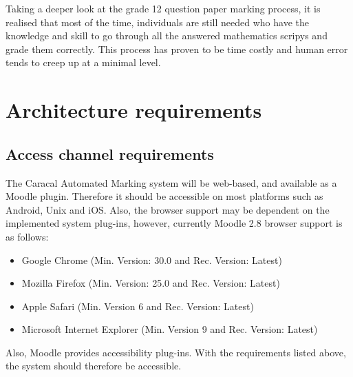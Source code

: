 \documentclass{article}
\begin{document}
Taking a deeper look at the grade 12 question paper marking process, it is realised that most of the time, individuals are still needed who have the knowledge and skill to go through all the answered mathematics scripys and grade them correctly. This process has proven to be time costly and human error tends to creep up at a minimal level.

\section{Architecture requirements}

	\subsection{Access channel requirements}
	
The Caracal Automated Marking system will be web-based, and available as a Moodle plugin. Therefore it should be accessible on most platforms such as Android, Unix and iOS. Also, the browser support may be dependent on the implemented system plug-ins, however, currently Moodle 2.8 browser support is as follows:
	\begin{itemize}
		\item Google Chrome (Min. Version: 30.0 and Rec. Version: Latest)
		\item Mozilla Firefox (Min. Version: 25.0 and Rec. Version: Latest)
		\item Apple Safari (Min. Version 6 and Rec. Version: Latest)
		\item Microsoft Internet Explorer (Min. Version 9 and Rec. Version: Latest)
	\end{itemize}
Also, Moodle provides accessibility plug-ins. With the requirements listed above, the system should therefore be accessible.
\end{document}

